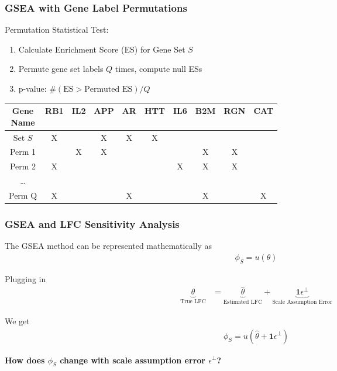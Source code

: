 \documentclass[11pt]{beamer}
\begin{document}
\begin{frame}
  \frametitle{GSEA with Gene Label Permutations}

  Permutation Statistical Test:
  \begin{enumerate}
    \item Calculate Enrichment Score (ES) for Gene Set \(S\)
    \item Permute gene set labels \(Q\) times, compute null ESs
    \item p-value: \(\# (\text{ES} > \text{Permuted ES}) / Q\)
  \end{enumerate}
  \begin{center}
    \begin{tabular}{| c | c | c | c | c | c | c | c | c | c |}
      \hline
      \makecell{Gene \\Name} & RB1 & IL2 & APP & AR & HTT & IL6 & B2M & RGN & CAT \\
      \hline
      Set \(S\) & X & & X & X & X & & & & \\
      \hline
      \hline
      Perm 1 & & X & X & & & & X & X & \\
      \hline
      Perm 2 & X & & & & & X & X & X & \\
      \hline
      \dots & & & & & & & & & \\
      \hline
      Perm Q & X & & & X & & & X & & X \\
      \hline
    \end{tabular}
  \end{center}
\end{frame}

\begin{frame}
  \frametitle{GSEA and LFC Sensitivity Analysis}

  The GSEA method can be represented mathematically as
  \begin{align*}
    \phi_S = u(\theta)
  \end{align*}

  \pause

  Plugging in
  \begin{align*}
    \underbrace{\theta}_{\text{True LFC}} &= \underbrace{\hat{\theta}}_{\text{Estimated LFC}} + \underbrace{\pmb{1}\epsilon^\perp}_{\text{Scale Assumption Error}}
  \end{align*}

  \pause

  We get
  \begin{align*}
    \phi_S = u(\hat{\theta}+\pmb{1}\epsilon^\perp)
  \end{align*}

  \textbf{How does \(\phi_S\) change with scale assumption error \(\epsilon^\perp\)?}
\end{frame}
\end{document}

